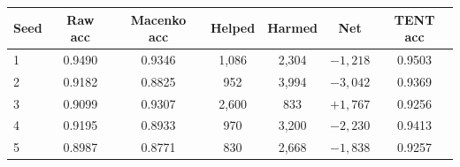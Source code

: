 \footnotesize
\setlength{\tabcolsep}{2.5pt}
\begin{tabular}{lcccccc}
\toprule
Seed & Raw acc & Macenko acc & Helped & Harmed & Net & TENT acc \\
\midrule
1 & 0.9490 & 0.9346 & 1{,}086 & 2{,}304 & $-1{,}218$ & 0.9503 \\
2 & 0.9182 & 0.8825 & 952 & 3{,}994 & $-3{,}042$ & 0.9369 \\
3 & 0.9099 & 0.9307 & 2{,}600 & 833 & $+1{,}767$ & 0.9256 \\
4 & 0.9195 & 0.8933 & 970 & 3{,}200 & $-2{,}230$ & 0.9413 \\
5 & 0.8987 & 0.8771 & 830 & 2{,}668 & $-1{,}838$ & 0.9257 \\
\bottomrule
\end{tabular}
